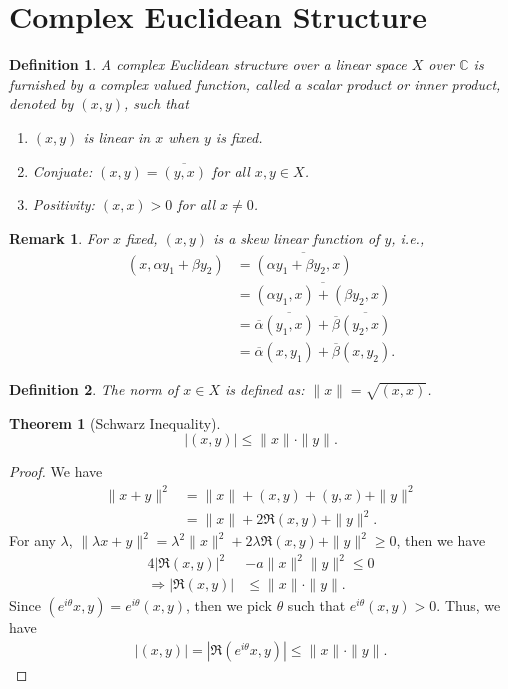 \documentclass[11pt]{book}
\newtheorem{definition}{Definition}[section]
\newtheorem{theorem}{Theorem}[section]
\newtheorem{remark}{Remark}[section]
\theoremstyle{definition}
\numberwithin{equation}{chapter}
\begin{document}
\medskip

\section{Complex Euclidean Structure}

\begin{definition}
A complex Euclidean structure over a linear space $X$ over $\mathbb{C}$ is furnished by a complex valued function, called a scalar product or inner product, denoted by $(x,y)$, such that
\begin{enumerate}[label=(\arabic*)]
    \item $(x,y)$ is linear in $x$ when $y$ is fixed.
    \item Conjuate: $(x,y) = \overline{(y,x)}$ for all $x,y\in X$.
    \item Positivity: $(x,x) > 0$ for all $x\neq 0$.
\end{enumerate}
\end{definition}
\begin{remark}
For $x$ fixed, $(x, y)$ is a skew linear function of $y$, i.e.,
\begin{align*}
    (x, \alpha y_1 + \beta y_2) & = \overline{(\alpha y_1 + \beta y_2,x)} \\
    & = \overline{(\alpha y_1,x) + (\beta y_2,x)} \\
    & = \overline{\alpha} \overline{(y_1,x)} + \overline{\beta} \overline{(y_2,x)} \\
    & = \overline{\alpha}(x, y_1) + \overline{\beta}(x, y_2).
\end{align*}
\end{remark}

\medskip

\begin{definition}
The norm of $x\in X$ is defined as: $\|x\| = \sqrt{(x,x)}$.
\end{definition}

\medskip

\begin{theorem}[Schwarz Inequality]\label{schwarz_inequality}
$$|(x,y)|\leq \|x\|\cdot \|y\|.$$
\end{theorem}
\begin{proof}
We have 
\begin{align*}
    \|x+y\|^2 & = \|x\| + (x,y) + (y,x) + \|y\|^2 \\
    & = \|x\| + 2\Re (x,y) + \|y\|^2.
\end{align*}
For any $\lambda$, $\|\lambda x + y\|^2 = \lambda^2 \|x\|^2 + 2\lambda \Re (x,y) + \|y\|^2 \geq 0$, then we have
\begin{align*}
    4\left|\Re (x,y)\right|^2 & - a\|x\|^2 \|y\|^2 \leq 0 \\
    \Rightarrow \left|\Re (x,y)\right| & \leq \|x\|\cdot \|y\|. 
\end{align*}
Since $\left(e^{i\theta}x,y\right) = e^{i\theta}(x,y)$, then we pick $\theta$ such that $e^{i\theta}(x,y) > 0$. Thus, we have
\begin{align*}
    \left|(x,y)\right| = \left|\Re (e^{i\theta}x,y)\right| \leq \|x\|\cdot \|y\|.
\end{align*}
\end{proof}
\end{document}
